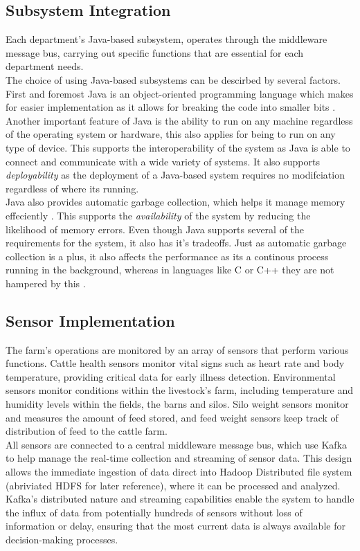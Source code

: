 \subsection{\textbf{Subsystem Integration}}
Each department's Java-based subsystem, operates through the middleware message bus, carrying out specific functions that are essential for each department needs. \vspace{2mm}\\
The choice of using Java-based subsystems can be descirbed by several factors. First and foremost Java is an object-oriented programming language which makes for easier implementation as it allows for breaking the code into smaller bits \cite{Team_2022}.
Another important feature of Java is the ability to run on any machine regardless of the operating system or hardware, this also applies for being to run on any type of device. This supports the interoperability of the system as Java is able to connect and communicate with a wide variety of systems. It also supports \textit{deployability} as the deployment of a Java-based system requires no modifciation regardless of where its running. \vspace{2mm} \\
Java also provides automatic garbage collection, which helps it manage memory effeciently \cite{Team_2022}. This supports the \textit{availability} of the system by reducing the likelihood of memory errors.
Even though Java supports several of the requirements for the system, it also has it's tradeoffs. Just as automatic garbage collection is a plus, it also affects the performance as its a continous process running in the background, whereas in languages like C or C++ they are not hampered by this \cite{Team_2022}. \vspace{1mm}

\subsection{\textbf{Sensor Implementation}}
The farm’s operations are monitored by an array of sensors that perform various functions. Cattle health sensors monitor vital signs such as heart rate and body temperature, providing critical data for early illness detection. Environmental sensors monitor conditions within the livestock's farm, including temperature and humidity levels within the fields, the barns and silos. Silo weight sensors monitor and measures the amount of feed stored, and feed weight sensors keep track of distribution of feed to the cattle farm. \vspace{2mm} \\
All sensors are connected to a central middleware message bus, which use Kafka to help manage the real-time collection and streaming of sensor data. This design allows the immediate ingestion of data direct into Hadoop Distributed file system (abriviated HDFS for later reference), where it can be processed and analyzed. Kafka’s distributed nature and streaming capabilities enable the system to handle the influx of data from potentially hundreds of sensors without loss of information or delay, ensuring that the most current data is always available for decision-making processes. \vspace{2mm}

